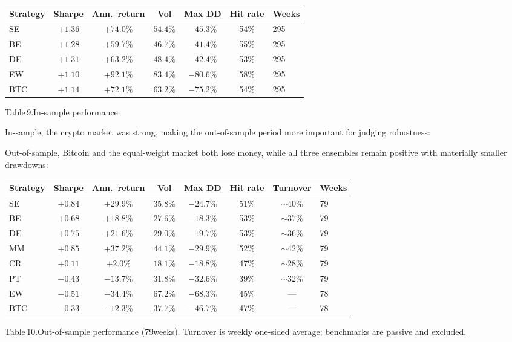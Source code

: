 \documentclass[11pt,a4paper]{article}
\begin{document}
\begin{center}
\small
\begin{tabular}{lcccccl}
\toprule
\rowcolor{tablehead}
\textbf{Strategy} & \textbf{Sharpe} & \textbf{Ann.\ return} & \textbf{Vol} & \textbf{Max DD} & \textbf{Hit rate} & \textbf{Weeks} \\
\midrule
SE  & $+1.36$ & $+74.0\%$ & $54.4\%$ & $-45.3\%$ & 54\% & 295 \\
BE  & $+1.28$ & $+59.7\%$ & $46.7\%$ & $-41.4\%$ & 55\% & 295 \\
DE  & $+1.31$ & $+63.2\%$ & $48.4\%$ & $-42.4\%$ & 53\% & 295 \\
EW  & $+1.10$ & $+92.1\%$ & $83.4\%$ & $-80.6\%$ & 58\% & 295 \\
BTC & $+1.14$ & $+72.1\%$ & $63.2\%$ & $-75.2\%$ & 54\% & 295 \\
\bottomrule
\end{tabular}
\end{center}
\smallskip
{\small Table\,9.\;In-sample performance.}

In-sample, the crypto market was strong, making the out-of-sample period more important for judging robustness:

Out-of-sample, Bitcoin and the equal-weight market both lose money, while all three ensembles remain positive with materially smaller drawdowns:

\begin{center}
\small
\begin{tabular}{lccccccl}
\toprule
\rowcolor{tablehead}
\textbf{Strategy} & \textbf{Sharpe} & \textbf{Ann.\ return} & \textbf{Vol} & \textbf{Max DD} & \textbf{Hit rate} & \textbf{Turnover} & \textbf{Weeks} \\
\midrule
SE  & $+0.84$ & $+29.9\%$ & $35.8\%$ & $-24.7\%$ & 51\% & ${\sim}40\%$ & 79 \\
BE  & $+0.68$ & $+18.8\%$ & $27.6\%$ & $-18.3\%$ & 53\% & ${\sim}37\%$ & 79 \\
DE  & $+0.75$ & $+21.6\%$ & $29.0\%$ & $-19.7\%$ & 53\% & ${\sim}36\%$ & 79 \\
MM  & $+0.85$ & $+37.2\%$ & $44.1\%$ & $-29.9\%$ & 52\% & ${\sim}42\%$ & 79 \\
CR  & $+0.11$ & $+2.0\%$  & $18.1\%$ & $-18.8\%$ & 47\% & ${\sim}28\%$ & 79 \\
PT  & $-0.43$ & $-13.7\%$ & $31.8\%$ & $-32.6\%$ & 39\% & ${\sim}32\%$ & 79 \\
EW  & $-0.51$ & $-34.4\%$ & $67.2\%$ & $-68.3\%$ & 45\% & --- & 78 \\
BTC & $-0.33$ & $-12.3\%$ & $37.7\%$ & $-46.7\%$ & 47\% & --- & 78 \\
\bottomrule
\end{tabular}
\end{center}
\smallskip
{\small Table\,10.\;Out-of-sample performance (79\;weeks). Turnover is weekly one-sided average; benchmarks are passive and excluded.}
\end{document}
